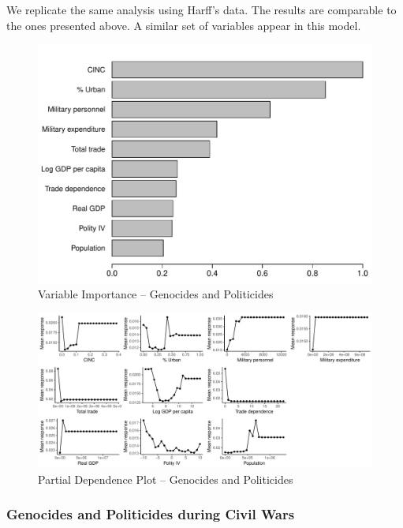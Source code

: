 We replicate the same analysis using Harff's \citeyear{harff2003no} data. The results are comparable to the ones presented above. A similar set of variables appear in this model.

\begin{figure}[H]
    \centering
    \includegraphics[width=.85\textwidth]{images/rf-uamk.pdf}
    \caption{Variable Importance -- Genocides and Politicides}
    \label{fig:rf-mk-4363}
\end{figure}

\newpage

\clearpage
\begin{figure}
    \centering
    \includegraphics[width=\textwidth]{images/rf-uamk-pd.pdf}
    \caption{Partial Dependence Plot -- Genocides and Politicides}
    \label{fig:rf-mk-4363}
\end{figure}
\clearpage

\newpage

\subsubsection{Genocides and Politicides during Civil Wars}

